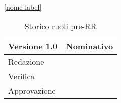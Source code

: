 \label{nome label} %
\ref{nome label} %
\pageref{nome label} %




\begin{table}[h]
	\begin{tabular}{p{} p{}}
		\toprule \textbf{Versione 1.0}	&	\textbf{Nominativo}\\
		\midrule Redazione	& \\
		\midrule Verifica &	\\
		\midrule Approvazione	&	\\
		\bottomrule
	\end{tabular}
	\caption{Storico ruoli pre-RR}
\end{table}

